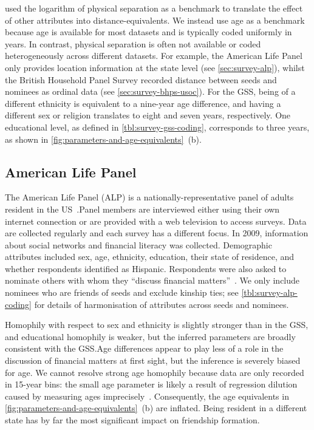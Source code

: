 \documentclass{scrartcl}
\begin{document}
\begin{refsection}
\textcite{Hipp2009} used the logarithm of physical separation as a benchmark to translate the effect of other attributes into distance-equivalents. We instead use age as a benchmark because age is available for most datasets and is typically coded uniformly in years. In contrast, physical separation is often not available or coded heterogeneously across different datasets. For example, the American Life Panel only provides location information at the state level (see \cref{sec:survey-alp}), whilst the British Household Panel Survey recorded distance between seeds and nominees as ordinal data (see \cref{sec:survey-bhps-usoc}). For the GSS, being of a different ethnicity is equivalent to a nine-year age difference, and having a different sex or religion translates to eight and seven years, respectively. One educational level, as defined in \cref{tbl:survey-gss-coding}, corresponds to three years, as shown in \cref{fig:parameters-and-age-equivalents}~(b).

\subsection{American Life Panel\label{sec:survey-alp}}

The American Life Panel (ALP) is a nationally-representative panel of adults resident in the US~\cite{Pollard2017}.\@ Panel members are interviewed either using their own internet connection or are provided with a web television to access surveys. Data are collected regularly and each survey has a different focus. In 2009, information about social networks and financial literacy was collected. Demographic attributes included sex, age, ethnicity, education, their state of residence, and whether respondents identified as Hispanic. Respondents were also asked to nominate others with whom they ``discuss financial matters''~\cite{Mihaly2009}. We only include nominees who are friends of seeds and exclude kinship ties; see \cref{tbl:survey-alp-coding} for details of harmonisation of attributes across seeds and nominees.

Homophily with respect to sex and ethnicity is slightly stronger than in the GSS, and educational homophily is weaker, but the inferred parameters are broadly consistent with the GSS.\@ Age differences appear to play less of a role in the discussion of financial matters at first sight, but the inference is severely biased for age. We cannot resolve strong age homophily because data are only recorded in 15-year bins: the small age parameter is likely a result of regression dilution caused by measuring ages imprecisely~\cite{Hutcheon2010}. Consequently, the age equivalents in \cref{fig:parameters-and-age-equivalents}~(b) are inflated. Being resident in a different state has by far the most significant impact on friendship formation.


\end{refsection}
\end{document}
